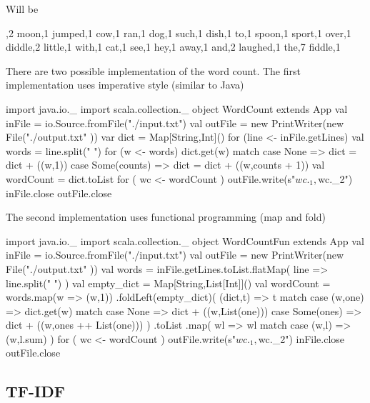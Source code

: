 \documentclass[10pt]{article}
\begin{document}
Will be 
\begin{code}
,2
moon,1
jumped,1
cow,1
ran,1
dog,1
such,1
dish,1
to,1
spoon,1
sport,1
over,1
diddle,2
little,1
with,1
cat,1
see,1
hey,1
away,1
and,2
laughed,1
the,7
fiddle,1
\end{code}

There are two possible implementation of the word count. The first
implementation uses imperative style (similar to Java) 
\begin{code}
import java.io._
import scala.collection._
object WordCount extends App {
  val inFile = io.Source.fromFile("./input.txt")
  val outFile = new PrintWriter(new File("./output.txt" ))
  var dict = Map[String,Int]()
  for (line <- inFile.getLines) {
    val words = line.split(" ")
    for (w <- words) {
      dict.get(w) match {
        case None => dict = dict + ((w,1))
        case Some(counts) => dict = dict + ((w,counts + 1))
      }
    }
  }
  val wordCount = dict.toList
  for ( wc <- wordCount ) {
    outFile.write(s"${wc._1},${wc._2}\n")
  }
  inFile.close
  outFile.close
}
\end{code}
The second implementation uses functional programming (map and fold) 
\begin{code}
import java.io._
import scala.collection._
object WordCountFun extends App {
  val inFile = io.Source.fromFile("./input.txt")
  val outFile = new PrintWriter(new File("./output.txt" ))
  val words = inFile.getLines.toList.flatMap( line => line.split(" ") )
  val empty_dict = Map[String,List[Int]]()
  val wordCount = words.map(w => (w,1))
          .foldLeft(empty_dict)( (dict,t) => t match {
            case (w,one) => dict.get(w) match {
              case None => dict + ((w,List(one)))
              case Some(ones) => dict + ((w,ones ++ List(one)))
            }
          })
          .toList
          .map( wl => wl match {
            case (w,l) => (w,l.sum)
          })
  for ( wc <- wordCount ) {
    outFile.write(s"${wc._1},${wc._2}\n")
  }
  inFile.close
  outFile.close
}
\end{code}


\subsection{TF-IDF}
\end{document}
